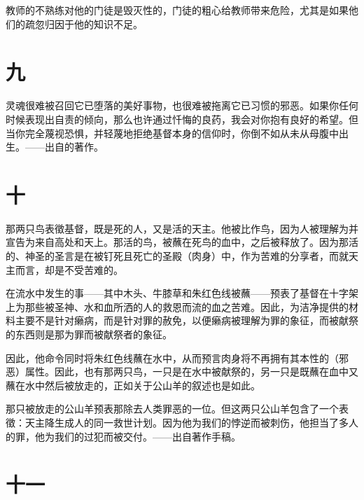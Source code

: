 教师的不熟练对他的门徒是毁灭性的，门徒的粗心给教师带来危险，尤其是如果他们的疏忽归因于他的知识不足。\par


\section{九}

灵魂很难被召回它已堕落的美好事物，也很难被拖离它已习惯的邪恶。如果你任何时候表现出自责的倾向，那么也许通过忏悔的良药，我会对你抱有良好的希望。但当你完全蔑视恐惧，并轻蔑地拒绝基督本身的信仰时，你倒不如从未从母腹中出生。——出自的著作。\par


\section{十}

那两只鸟表徵基督，既是死的人，又是活的天主。他被比作鸟，因为人被理解为并宣告为来自高处和天上。那活的鸟，被蘸在死鸟的血中，之后被释放了。因为那活的、神圣的圣言是在被钉死且死亡的圣殿（肉身）中，作为苦难的分享者，而就天主而言，却是不受苦难的。\par

在流水中发生的事——其中木头、牛膝草和朱红色线被蘸——预表了基督在十字架上为那些被圣神、水和血所洒的人的救恩而流的血之苦难。因此，为洁净提供的材料主要不是针对癞病，而是针对罪的赦免，以便癞病被理解为罪的象征，而被献祭的东西则是那为罪而被献祭者的象征。\par

因此，他命令同时将朱红色线蘸在水中，从而预言肉身将不再拥有其本性的（邪恶）属性。因此，也有那两只鸟，一只是在水中被献祭的，另一只是既蘸在血中又蘸在水中然后被放走的，正如关于公山羊的叙述也是如此。\par

那只被放走的公山羊预表那除去人类罪恶的一位。但这两只公山羊包含了一个表徵：天主降生成人的同一救世计划。因为他为我们的悖逆而被刺伤，他担当了多人的罪，他为我们的过犯而被交付。——出自著作手稿。\par


\section{十一}

